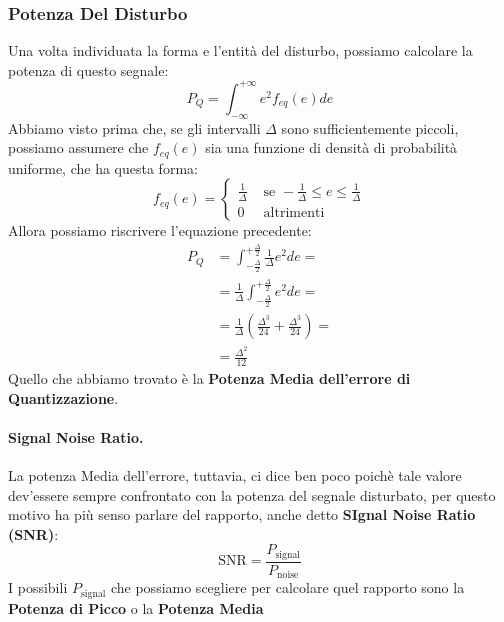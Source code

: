 \subsubsection{Potenza Del Disturbo}
Una volta individuata la forma e l'entità del disturbo, possiamo calcolare la potenza di questo segnale:
\begin{equation*}
    P_Q = \int_{-\infty}^{+\infty} e^2 f_{eq}(e)de
\end{equation*}
Abbiamo visto prima che, se gli intervalli $\Delta$ sono sufficientemente piccoli, possiamo assumere che $f_{eq}(e)$ sia una
funzione di densità di probabilità uniforme, che ha questa forma:
\begin{equation}
    f_{eq}(e) = \begin{cases}
        \frac{1}{\Delta} &\text{ se } -\frac{1}{\Delta} \leq e \leq \frac{1}{\Delta}\\
        0                &\text{ altrimenti}
    \end{cases}
\end{equation}
Allora possiamo riscrivere l'equazione precedente:
\begin{align*}
    P_Q &= \int_{-\frac{\Delta}{2}}^{+\frac{\Delta}{2}} \frac{1}{\Delta} e^2 de =\\
        &= \frac{1}{\Delta} \int_{-\frac{\Delta}{2}}^{+\frac{\Delta}{2}} e^2 de =\\
        &= \frac{1}{\Delta} \left( \frac{\Delta^3}{24} +  \frac{\Delta^3}{24}\right) =\\
        &= \frac{\Delta^2}{12}
\end{align*}
Quello che abbiamo trovato è la \textbf{Potenza Media dell'errore di Quantizzazione}. 

\paragraph{Signal Noise Ratio.}La potenza Media dell'errore, tuttavia,
ci dice ben poco poichè tale valore dev'essere sempre confrontato con la potenza del segnale disturbato,
per questo motivo ha più senso parlare del rapporto, anche detto \textbf{SIgnal Noise Ratio (SNR)}:
\begin{equation}
    \text{SNR} = \frac{P_\text{signal}}{P_\text{noise}}
\end{equation}
I possibili $P_\text{signal}$ che possiamo scegliere per calcolare quel rapporto sono la \textbf{Potenza di Picco} o la \textbf{Potenza Media}

